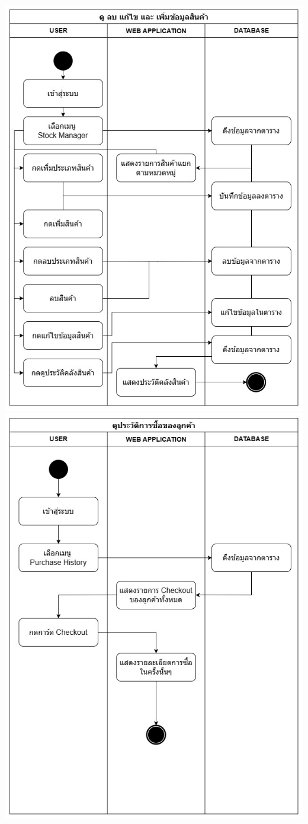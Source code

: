 \begin{center}
    \includegraphics[scale=0.25]{pic/diagram/ad-web1.jpg}
    \includegraphics[scale=0.25]{pic/diagram/ad-web2.jpg}

\end{center}
